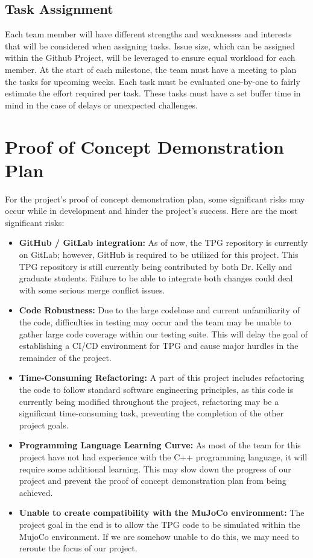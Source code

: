 \documentclass{article}
\begin{document}
\subsection{Task Assignment}
Each team member will have different strengths and weaknesses and interests that will be considered when assigning tasks. Issue size, which can be assigned within the Github Project, will be leveraged to ensure equal workload for each member. At the start of each milestone, the team must have a meeting to plan the tasks for upcoming weeks. Each task must be evaluated one-by-one to fairly estimate the effort required per task. These tasks must have a set buffer time in mind in the case of delays or unexpected challenges.

\section{Proof of Concept Demonstration Plan}


For the project's proof of concept demonstration plan, some significant risks may occur while in development and hinder the project's success. Here are the most significant risks:
\begin{itemize}
  \item \textbf{GitHub / GitLab integration:} As of now, the TPG repository is currently on GitLab; however, GitHub is required to be utilized for this project. This TPG repository is still currently being contributed by both Dr. Kelly and graduate students. Failure to be able to integrate both changes could deal with some serious merge conflict issues.
  \item \textbf{Code Robustness:} Due to the large codebase and current unfamiliarity of the code, difficulties in testing may occur and the team may be unable to gather large code coverage within our testing suite. This will delay the goal of establishing a CI/CD environment for TPG and cause major hurdles in the remainder of the project.
  \item \textbf{Time-Consuming Refactoring:} A part of this project includes refactoring the code to follow standard software engineering principles, as this code is currently being modified throughout the project, refactoring may be a significant time-consuming task, preventing the completion of the other project goals.
  \item \textbf{Programming Language Learning Curve:} As most of the team for this project have not had experience with the C++ programming language, it will require some additional learning. This may slow down the progress of our project and prevent the proof of concept demonstration plan from being achieved.
  \item \textbf{Unable to create compatibility with the MuJoCo environment:} The project goal in the end is to allow the TPG code to be simulated within the MujoCo environment. If we are somehow unable to do this, we may need to reroute the focus of our project.
\end{itemize}
\end{document}
